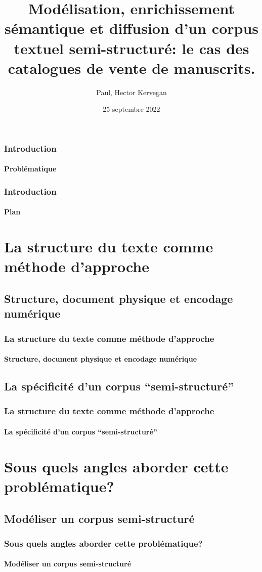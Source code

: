 \documentclass{beamer}
\title{Modélisation, enrichissement sémantique et diffusion d'un corpus textuel semi-structuré: le cas des catalogues de vente de manuscrits.}
\date{25 septembre 2022}
\author[Paul H. Kervegan]{Paul, Hector Kervegan}
\begin{document}
\begin{frame}
	\titlepage
\end{frame}

\begin{frame}
	\frametitle{Introduction}
	\framesubtitle{Problématique}
	
\end{frame}

\begin{frame}
	\frametitle{Introduction}
	\framesubtitle{Plan}
	\tableofcontents
\end{frame}


\section{La structure du texte comme méthode d'approche}
\subsection{Structure, document physique et encodage numérique}
\begin{frame}
	\frametitle{La structure du texte comme méthode d'approche}
	\framesubtitle{Structure, document physique et encodage numérique}
	
\end{frame}

\subsection{La spécificité d'un corpus \enquote{semi-structuré}}
\begin{frame}
	\frametitle{La structure du texte comme méthode d'approche}
	\framesubtitle{La spécificité d'un corpus \enquote{semi-structuré}}
	
\end{frame}

\section{Sous quels angles aborder cette problématique?}
\subsection{Modéliser un corpus semi-structuré}
\begin{frame}
	\frametitle{Sous quels angles aborder cette problématique?}
	\framesubtitle{Modéliser un corpus semi-structuré}

\end{frame}
\end{document}
